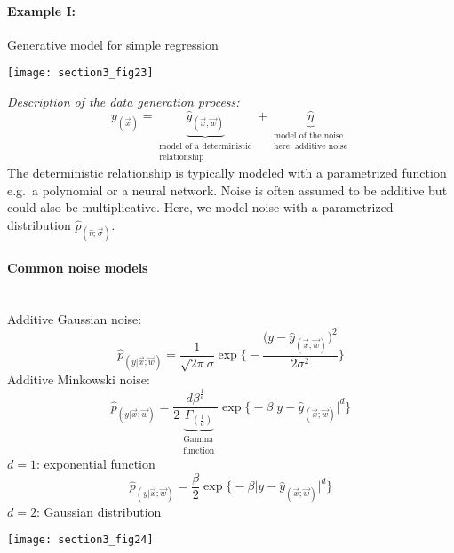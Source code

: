 \paragraph{Example I:} Generative model for simple regression
\begin{center}
\texttt{[image: section3\_fig23]} 
\end{center}
\emph{Description of the data generation process:}
\begin{equation}
  y_{(\vec{x})} = 
  \underbrace{ \widehat{y}_{(\vec{x};\vec{w})} }_{
    \substack{ 	\text{model of a deterministic} \\
      \text{relationship}}}
    + \underbrace{\widehat{\eta}}_{
      \substack{\text{model of the noise} \\
       \text{here: additive noise}}}
\end{equation}
The deterministic relationship is typically modeled with a
parametrized function e.g.\ a polynomial or a neural network. Noise is
often assumed to be additive but could also be multiplicative. Here, we model
noise with a parametrized distribution 
$\widehat{p}_{(\widehat{\eta}; \vec{\sigma})}$. 

\paragraph{Common noise models}\mbox{}\\
Additive Gaussian noise:
\begin{equation}
	\widehat{p}_{(y|\vec{x};\vec{w})} 
	= \frac{1}{\sqrt{2 \pi} \sigma} \exp \Bigg\{
		-\frac{ \big( y - \widehat{y}_{(\vec{x};\vec{w})} \big)^2 }{
			2 \sigma^2} \Bigg\}
\end{equation}
Additive Minkowski noise:
\begin{equation}
	\widehat{p}_{(y|\vec{x};\vec{w})} 
	= \frac{d \beta^{\frac{1}{d}}}{2 
		\underbrace{ \Gamma_{(\frac{1}{d})} }_{
			\substack{ 	\text{Gamma} \\
					\text{function} }
			} }
		\exp \Big\{ -\beta \big| y - \widehat{y}_{(\vec{x};\vec{w})}
			\big|^d \Big\}
\end{equation}
\indent $d = 1$: exponential function
\begin{equation}
	\widehat{p}_{(y|\vec{x};\vec{w})}
	= \frac{\beta}{2} \exp \Big\{ -\beta \big| y - 
		\widehat{y}_{(\vec{x};\vec{w})}	\big|^d \Big\}
\end{equation}
\indent $d = 2$: Gaussian distribution
\begin{center}
\texttt{[image: section3\_fig24]} 
\end{center}
